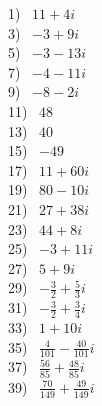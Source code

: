 \documentclass[12pt]{book}
\theoremstyle{definition}
\begin{document}
\begin{multicols}{4}
  1)~ $11+4i$\\
  3)~ $-3+9i$\\
  5)~ $-3-13i$\\
  7)~ $-4-11i$\\
  9)~ $-8-2i$\\
  11)~ $48$\\
  13)~ $40$\\
  15)~ $-49$\\
  17)~ $11+60i$\\
  19)~ $80-10i$\\
  21)~ $27+38i$\\
  23)~ $44+8i$\\
  25)~ $-3+11i$\\
  27)~ $5+9i$\\
  29)~ $-\frac{3}{2}+\frac{5}{3}i$\\
  31)~ $-\frac{3}{2}+\frac{3}{4}i$\\
  33)~ $1+10i$\\
  35)~ $\frac{4}{101}-\frac{40}{101}i$\\
  37)~ $\frac{56}{85}+\frac{48}{85}i$\\
  39)~ $\frac{70}{149}+\frac{49}{149}i$\\

\end{multicols}
\end{document}
